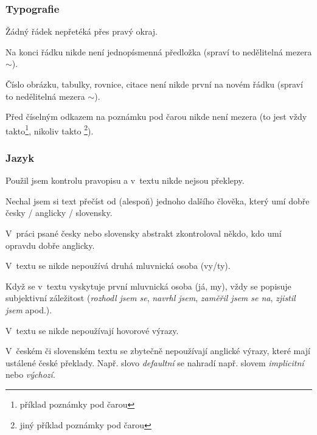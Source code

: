 \subsubsection*{Typografie}
\begin{checklist}
	\item Žádný řádek nepřetéká přes pravý okraj.
	\item Na konci řádku nikde není jednopísmenná předložka (spraví to nedělitelná mezera $\sim$).
	\item Číslo obrázku, tabulky, rovnice, citace není nikde první na novém řádku (spraví to nedělitelná mezera $\sim$).
	\item Před číselným odkazem na poznámku pod čarou nikde není mezera (to jest vždy takto\footnote{příklad poznámky pod čarou}, nikoliv takto \footnote{jiný příklad poznámky pod čarou}).
\end{checklist}

\subsubsection*{Jazyk}
\begin{checklist}
    \item Použil jsem kontrolu pravopisu a v~textu nikde nejsou překlepy.
	\item Nechal jsem si text přečíst od (alespoň) jednoho dalšího člověka, který umí dobře česky / anglicky / slovensky.
	\item V~práci psané česky nebo slovensky abstrakt zkontroloval někdo, kdo umí opravdu dobře anglicky.
	\item V~textu se nikde nepoužívá druhá mluvnická osoba (vy/ty).
	\item Když se v~textu vyskytuje první mluvnická osoba (já, my), vždy se popisuje subjektivní záležitost (\textit{rozhodl jsem se}, \textit{navrhl jsem}, \textit{zaměřil jsem se na}, \textit{zjistil jsem} apod.).
	\item V~textu se nikde nepoužívají hovorové výrazy.
	\item V~českém či slovenském textu se zbytečně nepoužívají anglické výrazy, které mají ustálené české překlady. Např. slovo \textit{defaultní} se nahradí např. slovem \textit{implicitní} nebo \textit{výchozí}.
\end{checklist}

